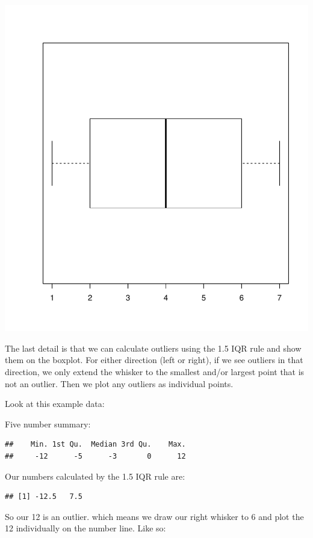 \documentclass[
]{book}
\theoremstyle{definition}
\theoremstyle{definition}
\theoremstyle{definition}
\theoremstyle{definition}
\theoremstyle{remark}
\begin{document}
\includegraphics{_main_files/figure-latex/unnamed-chunk-22-1.pdf}

The last detail is that we can calculate outliers using the 1.5 IQR rule
and show them on the boxplot. For either direction (left or right), if
we see outliers in that direction, we only extend the whisker to the
smallest and/or largest point that is not an outlier. Then we plot any
outliers as individual points.

Look at this example data:

Five number summary:

\begin{verbatim}
##    Min. 1st Qu.  Median 3rd Qu.    Max. 
##     -12      -5      -3       0      12
\end{verbatim}

Our numbers calculated by the 1.5 IQR rule are:

\begin{verbatim}
## [1] -12.5   7.5
\end{verbatim}

So our 12 is an outlier. which means we draw our right whisker to 6 and
plot the 12 individually on the number line. Like so:
\end{document}
